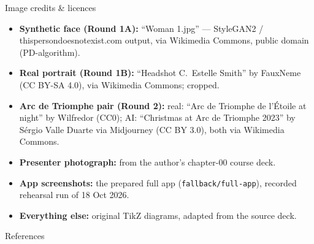 \begin{frame}{Image credits \& licences}\label{frm:credits}
  \footnotesize
  \begin{itemize}\setlength{\itemsep}{3pt}
    \item \textbf{Synthetic face (Round 1A):} ``Woman 1.jpg'' --- StyleGAN2 / thispersondoesnotexist.com output, via Wikimedia Commons, public domain (PD-algorithm).
    \item \textbf{Real portrait (Round 1B):} ``Headshot C.\ Estelle Smith'' by FauxNeme (CC BY-SA 4.0), via Wikimedia Commons; cropped.
    \item \textbf{Arc de Triomphe pair (Round 2):} real: ``Arc de Triomphe de l'\'Etoile at night'' by Wilfredor (CC0); AI: ``Christmas at Arc de Triomphe 2023'' by S\'ergio Valle Duarte via Midjourney (CC BY 3.0), both via Wikimedia Commons.
    \item \textbf{Presenter photograph:} from the author's chapter-00 course deck.
    \item \textbf{App screenshots:} the prepared full app (\texttt{fallback/full-app}), recorded rehearsal run of 18 Oct 2026.
    \item \textbf{Everything else:} original TikZ diagrams, adapted from the source deck.
  \end{itemize}
\end{frame}

\nocite{*}
\begin{frame}[allowframebreaks,t]{References}\label{frm:refs}
  \printbibliography[heading=none]
\end{frame}

